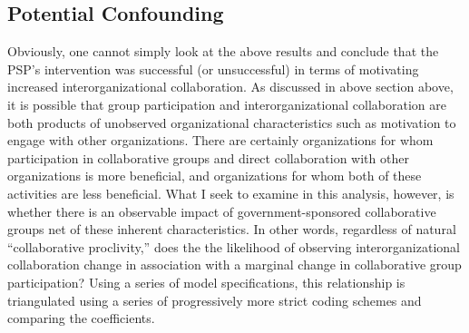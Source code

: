 \documentclass[12pt,a4paper,titlepage]{article}
\begin{document}
\subsection{Potential Confounding}

Obviously, one cannot simply look at the above results and conclude that the PSP's intervention was successful (or unsuccessful) in terms of motivating increased interorganizational collaboration. As discussed in above section above, it is possible that group participation and interorganizational collaboration are both products of unobserved organizational characteristics such as motivation to engage with other organizations. There are certainly organizations for whom participation in collaborative groups and direct collaboration with other organizations is more beneficial, and organizations for whom both of these activities are less beneficial. What I seek to examine in this analysis, however, is whether there is an observable impact of government-sponsored collaborative groups net of these inherent characteristics. In other words, regardless of natural “collaborative proclivity,” does the the likelihood of observing interorganizational collaboration change in association with a marginal change in collaborative group participation? Using a series of model specifications, this relationship is triangulated using a series of progressively more strict coding schemes and comparing the coefficients.


\end{document}
